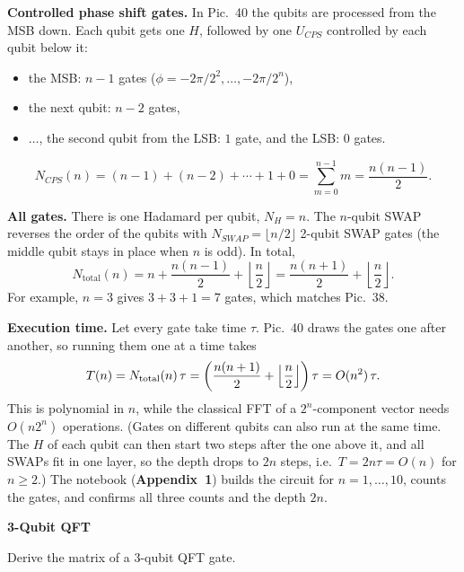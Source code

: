\documentclass[a4paper, 10pt]{article}
\begin{document}
\begin{solution}
	\noindent \textbf{Controlled phase shift gates.} In Pic.~40 the qubits are processed from the MSB down. Each qubit gets one \( H \), followed by one \( U_{CPS} \) controlled by each qubit below it:
	\begin{itemize}
		\item the MSB: \( n - 1 \) gates (\( \phi = -2\pi/2^2, \dots, -2\pi/2^n \)),
		\item the next qubit: \( n - 2 \) gates,
		\item \( \dots \), the second qubit from the LSB: \( 1 \) gate, and the LSB: \( 0 \) gates.
	\end{itemize}
	\[
		N_{CPS}(n) = (n - 1) + (n - 2) + \cdots + 1 + 0 = \sum_{m = 0}^{n - 1}m = \frac{n(n - 1)}{2}.
	\]

	\myspace

	\noindent \textbf{All gates.} There is one Hadamard per qubit, \( N_H = n \). The \( n \)-qubit SWAP reverses the order of the qubits with \( N_{SWAP} = \lfloor n/2 \rfloor \) 2-qubit SWAP gates (the middle qubit stays in place when \( n \) is odd). In total,
	\[
		N_{\text{total}}(n) = n + \frac{n(n - 1)}{2} + \left\lfloor \frac{n}{2} \right\rfloor = \frac{n(n + 1)}{2} + \left\lfloor \frac{n}{2} \right\rfloor .
	\]
	For example, \( n = 3 \) gives \( 3 + 3 + 1 = 7 \) gates, which matches Pic.~38.

	\myspace

	\noindent \textbf{Execution time.} Let every gate take time \( \tau \). Pic.~40 draws the gates one after another, so running them one at a time takes
	\[
		T(n) = N_{\text{total}}(n)\,\tau = \left(\frac{n(n + 1)}{2} + \left\lfloor \frac{n}{2} \right\rfloor\right)\tau = O(n^2)\,\tau .
	\]
	This is polynomial in \( n \), while the classical FFT of a \( 2^n \)-component vector needs \( O(n2^n) \) operations.
	(Gates on different qubits can also run at the same time. The \( H \) of each qubit can then start two steps after the one above it, and all SWAPs fit in one layer, so the depth drops to \( 2n \) steps, i.e.\ \( T = 2n\tau = O(n) \) for \( n \ge 2 \).)
	The notebook (\textbf{Appendix~1}) builds the circuit for \( n = 1, \dots, 10 \), counts the gates, and confirms all three counts and the depth \( 2n \).
\end{solution}

\newpage

\begin{problem}
\textbf{3-Qubit QFT}
\par Derive the matrix of a 3-qubit QFT gate.
\end{problem}
\end{document}
